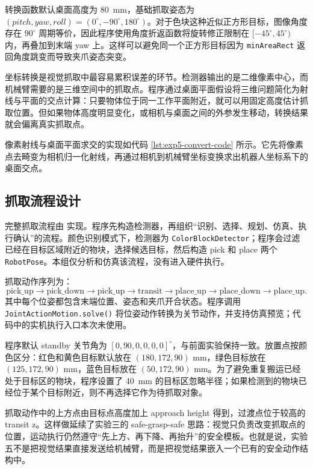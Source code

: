 转换函数默认桌面高度为 \SI{80}{mm}，基础抓取姿态为 $(pitch,yaw,roll)=(0^\circ,-90^\circ,180^\circ)$。对于色块这种近似正方形目标，图像角度存在 $90^\circ$ 周期等价，因此程序使用角度折返函数将旋转修正限制在 $[-45^\circ,45^\circ)$ 内，再叠加到末端 yaw 上。这样可以避免同一个正方形目标因为 \texttt{minAreaRect} 返回角度跳变而导致夹爪姿态突变。

坐标转换是视觉抓取中最容易累积误差的环节。检测器输出的是二维像素中心，而机械臂需要的是三维空间中的抓取点。程序通过桌面平面假设将三维问题简化为射线与平面的交点计算：只要物体位于同一工作平面附近，就可以用固定高度估计抓取位置。但如果物体高度明显变化，或相机与桌面之间的外参发生移动，转换结果就会偏离真实抓取点。

像素射线与桌面平面求交的实现如代码 \ref{lst:exp5-convert-code} 所示。它先将像素点去畸变为相机归一化射线，再通过相机到机械臂坐标变换求出机器人坐标系下的桌面交点。



\subsection{抓取流程设计}

完整抓取流程由  实现。程序先构造检测器，再组织“识别、选择、规划、仿真、执行确认”的流程。颜色识别模式下，检测器为 \texttt{ColorBlockDetector}；程序会过滤已经在目标区域附近的物块，选择候选目标，然后构造 pick 和 place 两个 \texttt{RobotPose}。本组仅分析和仿真该流程，没有进入硬件执行。

抓取动作序列为：
\[
\text{pick\_up}\rightarrow \text{pick\_down}\rightarrow \text{pick\_up}\rightarrow
\text{transit}\rightarrow \text{place\_up}\rightarrow \text{place\_down}\rightarrow
\text{place\_up}.
\]
其中每个位姿都包含末端位置、姿态和夹爪开合状态。程序调用 \texttt{JointActionMotion.\allowbreak solve()} 将位姿动作转换为关节动作，并支持仿真预览；代码中的实机执行入口本次未使用。

程序默认 standby 关节角为 $[0,90,0,0,0,0]^\circ$，与前面实验保持一致。放置点按颜色区分：红色和黄色目标默认放在 $(180,172,90)$ mm，绿色目标放在 $(125,172,90)$ mm，蓝色目标放在 $(50,172,90)$ mm。为了避免重复搬运已经处于目标区的物块，程序设置了 \SI{40}{mm} 的目标区忽略半径；如果检测到的物块已经位于某个目标附近，则不再选择它作为待抓取对象。

抓取动作中的上方点由目标点高度加上 approach height 得到，过渡点位于较高的 transit z。这样做延续了实验三的 safe-grasp-safe 思路：视觉只负责改变抓取点的位置，运动执行仍然遵守“先上方、再下降、再抬升”的安全模板。也就是说，实验五不是把视觉结果直接发送给机械臂，而是把视觉结果嵌入一个已有的安全动作结构中。

